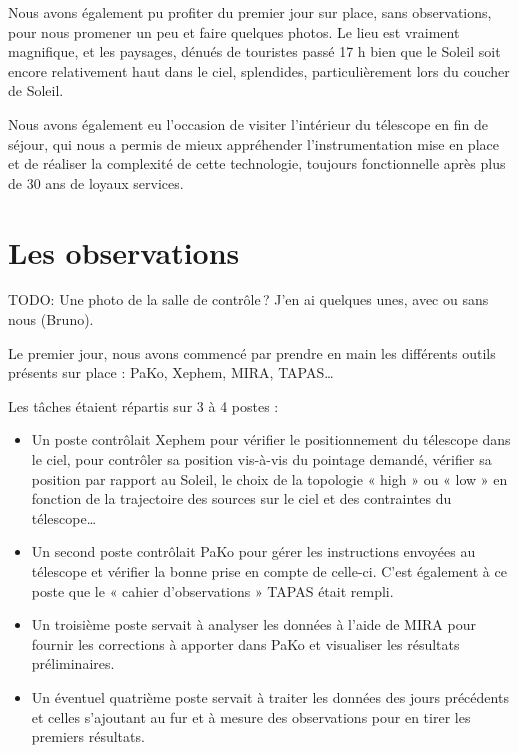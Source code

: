 \documentclass[a4paper,10pt,french]{article}
\begin{document}
Nous avons également pu profiter du premier jour sur place, sans observations,
pour nous promener un peu et faire quelques photos. Le lieu est vraiment
magnifique, et les paysages, dénués de touristes passé 17 h bien que le Soleil
soit encore relativement haut dans le ciel, splendides, particulièrement lors
du coucher de Soleil.

Nous avons également eu l’occasion de visiter l’intérieur du télescope en fin
de séjour, qui nous a permis de mieux appréhender l’instrumentation mise en
place et de réaliser la complexité de cette technologie, toujours fonctionnelle
après plus de 30 ans de loyaux services.

\section{Les observations}

TODO: Une photo de la salle de contrôle ? J’en ai quelques unes, avec ou sans nous (Bruno).

Le premier jour, nous avons commencé par prendre en main les différents outils
présents sur place : PaKo, Xephem, MIRA, TAPAS…

Les tâches étaient répartis sur 3 à 4 postes :
\begin{itemize}
    \item Un poste contrôlait Xephem pour vérifier le positionnement du
          télescope dans le ciel, pour contrôler sa position vis-à-vis du
          pointage demandé, vérifier sa position par rapport au Soleil, le
          choix de la topologie « high » ou « low » en fonction de la
          trajectoire des sources sur le ciel et des contraintes du télescope…
    \item Un second poste contrôlait PaKo pour gérer les instructions envoyées
          au télescope et vérifier la bonne prise en compte de celle-ci. C’est
          également à ce poste que le « cahier d’observations » TAPAS était
          rempli.
    \item Un troisième poste servait à analyser les données à l’aide de MIRA
          pour fournir les corrections à apporter dans PaKo et visualiser les
          résultats préliminaires.
    \item Un éventuel quatrième poste servait à traiter les données des jours
          précédents et celles s’ajoutant au fur et à mesure des observations
          pour en tirer les premiers résultats.
\end{itemize}
\end{document}
